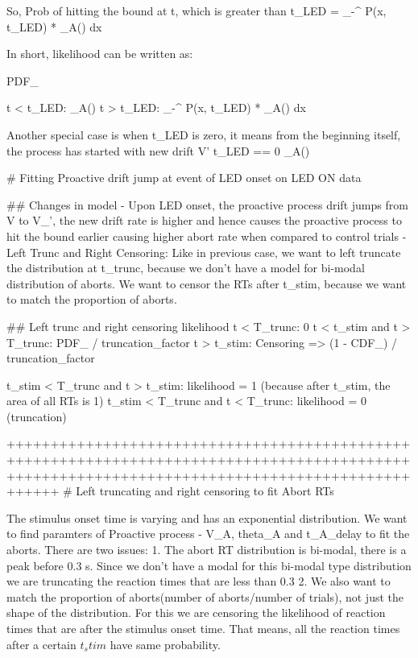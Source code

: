 So, Prob of hitting the bound at t, which is greater than t_LED
 = \int_{-\inf}^{\theta} P(x, t_{LED}) * \rho_A() dx

 In short, likelihood can be written as:

 PDF_{}
 
t < t_LED: \rho_A()
t > t_LED: \int_{-\inf}^{\theta} P(x, t_{LED}) * \rho_A() dx

Another special case is when t_LED is zero, it means from the beginning itself, the process has started with new drift V'
t_LED == 0 \rho_A()


# Fitting Proactive drift jump at event of LED onset on LED ON data


## Changes in model
- Upon LED onset, the proactive process drift jumps from V to V_', the new drift rate is higher and hence causes the 
proactive process to hit the bound earlier causing higher abort rate when compared to control trials
- Left Trunc and Right Censoring: Like in previous case, we want to left truncate the distribution at t_trunc, because we don't have a model for 
bi-modal distribution of aborts. We want to censor the RTs after t_stim, because we want to match the proportion of aborts.


## Left trunc and right censoring likelihood
t < T_trunc: 0
t < t_stim and t > T_trunc: PDF_{} / truncation_factor
t > t_stim: Censoring => (1 - CDF_{}) / truncation_factor

t_stim < T_trunc and t > t_stim: likelihood = 1 (because after t_stim, the area of all RTs is 1)
t_stim < T_trunc and t < T_trunc: likelihood = 0 (truncation)


























++++++++++++++++++++++++++++++++++++++++++++++++++++++++++++++++++++++++++++++++++++++++++++++++++++++++++++++++++++++++++++++++++++++++++++++++
# Left truncating and right censoring to fit Abort RTs

The stimulus onset time is varying and has an exponential distribution. We want to find paramters of Proactive process 
- V_A, theta_A and t_A_delay to fit the aborts. There are two issues:
1. The abort RT distribution is bi-modal, there is a peak before 0.3 s. Since we don't have a modal for this bi-modal type distribution
we are truncating the reaction times that are less than 0.3
2. We also want to match the proportion of aborts(number of aborts/number of trials), not just the shape of the distribution. 
For this we are censoring the likelihood of reaction times that are after the stimulus onset time. That means, all the reaction times
after a certain  $t_stim$ have same probability.

